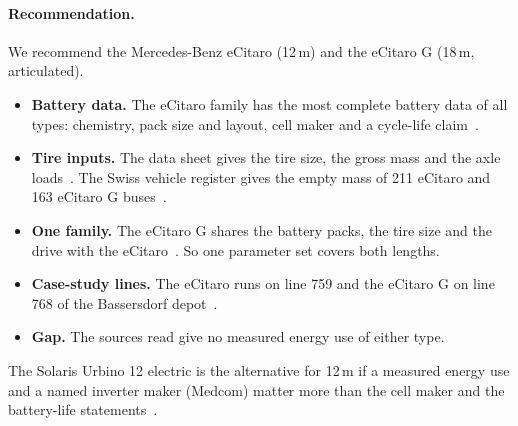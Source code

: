 \documentclass[11pt,a4paper]{article}
\theoremstyle{plain}
\theoremstyle{definition}
\theoremstyle{remark}
\begin{document}
\paragraph{Recommendation.}
We recommend the Mercedes-Benz eCitaro (12\,m) and the eCitaro G (18\,m, articulated).
\begin{itemize}
  \item \textbf{Battery data.} The eCitaro family has the most complete battery data of all types: chemistry, pack size and layout, cell maker and a cycle-life claim~\cite{DaimlerTruck2022eCitaro,DaimlerTruck2023eCitaro}\cite[p.~10]{Daimler2026eCitaro}.
  \item \textbf{Tire inputs.} The data sheet gives the tire size, the gross mass and the axle loads~\cite[pp.~4,~9]{Daimler2026eCitaro}.
    The Swiss vehicle register gives the empty mass of 211 eCitaro and 163 eCitaro G buses~\cite{ASTRA2026Stock}.
  \item \textbf{One family.} The eCitaro G shares the battery packs, the tire size and the drive with the eCitaro~\cite[pp.~4,~6,~10]{Daimler2026eCitaro}.
    So one parameter set covers both lengths.
  \item \textbf{Case-study lines.} The eCitaro runs on line 759 and the eCitaro G on line 768 of the Bassersdorf depot~\cite{VBG2023Line759,VBG2025Line768}.
  \item \textbf{Gap.} The sources read give no measured energy use of either type.
\end{itemize}
The Solaris Urbino 12 electric is the alternative for 12\,m if a measured energy use and a named inverter maker (Medcom) matter more than the cell maker and the battery-life statements~\cite[p.~11]{Tschakert2020}.
\end{document}
